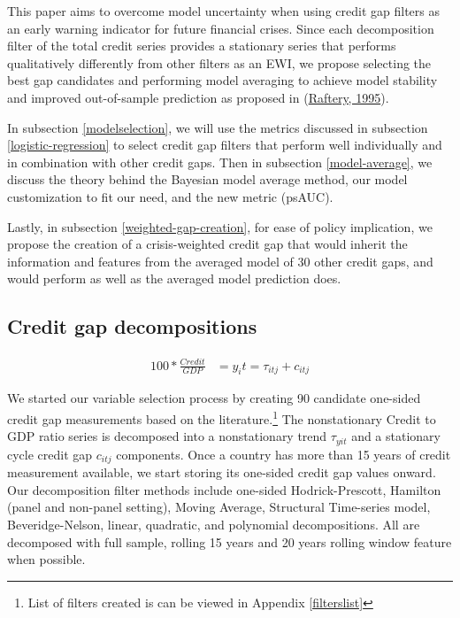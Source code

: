\documentclass[
  12pt,
]{article}
\begin{document}
This paper aims to overcome model uncertainty when using credit gap filters as an early warning indicator for future financial crises. Since each decomposition filter of the total credit series provides a stationary series that performs qualitatively differently from other filters as an EWI, we propose selecting the best gap candidates and performing model averaging to achieve model stability and improved out-of-sample prediction as proposed in (\protect\hyperlink{ref-raftery_bayesian_1995}{Raftery, 1995}).

In subsection \ref{modelselection}, we will use the metrics discussed in subsection \ref{logistic-regression} to select credit gap filters that perform well individually and in combination with other credit gaps. Then in subsection \ref{model-average}, we discuss the theory behind the Bayesian model average method, our model customization to fit our need, and the new metric (psAUC).

Lastly, in subsection \ref{weighted-gap-creation}, for ease of policy implication, we propose the creation of a crisis-weighted credit gap that would inherit the information and features from the averaged model of 30 other credit gaps, and would perform as well as the averaged model prediction does.

\hypertarget{decomp}{%
\subsection{Credit gap decompositions}\label{decomp}}

\begin{align}
    100*\frac{Credit}{GDP} &= y_it = \tau_{itj} + c_{itj}
\end{align}

We started our variable selection process by creating 90 candidate one-sided credit gap measurements based on the literature.\footnote{List of filters created is can be viewed in Appendix \ref{filterslist}} The nonstationary Credit to GDP ratio series is decomposed into a nonstationary trend \(\tau_{yit}\) and a stationary cycle credit gap \(c_{itj}\) components. Once a country has more than 15 years of credit measurement available, we start storing its one-sided credit gap values onward. Our decomposition filter methods include one-sided Hodrick-Prescott, Hamilton (panel and non-panel setting), Moving Average, Structural Time-series model, Beveridge-Nelson, linear, quadratic, and polynomial decompositions. All are decomposed with full sample, rolling 15 years and 20 years rolling window feature when possible.
\end{document}
